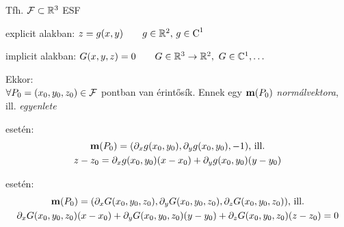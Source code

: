\begin{te}%
  Tfh. $\mathcal F\subset\mathbb{R}^3$ ESF
  \begin{enumzjb}
  \item explicit alakban: $z=g(x,y)\qquad g\in\mathbb{R}^2,\,g\in\operatorname{C}^1$
  \item implicit alakban: $G(x,y,z) = 0\qquad G\in\mathbb{R}^3\to\mathbb{R}^2,\ G\in\mathbb{C}^1,\ldots$
  \end{enumzjb}
  Ekkor:\\
  $\forall P_0=(x_0,y_0,z_0)\in\mathcal F$ pontban van érintősík. Ennek egy $\mathbf{m}(P_0)$ \emph{normálvektora},
  ill. \emph{egyenlete}
  \begin{enumzjr}
  \item esetén:
    \begin{gather*}
      \mathbf{m}(P_0) = (\partial_xg(x_0,y_0), \partial_yg(x_0,y_0),-1)\text{, ill.}\\
      z-z_0 = \partial_xg(x_0,y_0)(x-x_0) + \partial_yg(x_0,y_0)(y-y_0)      
    \end{gather*}

  \item esetén:
    \begin{gather*}
      \mathbf{m}(P_0) = (\partial_xG(x_0,y_0,z_0),\partial_yG(x_0,y_0,z_0),\partial_zG(x_0,y_0,z_0))\text{, ill.}\\
      \partial_xG(x_0,y_0,z_0)(x-x_0) + \partial_yG(x_0,y_0,z_0)(y-y_0) +\partial_zG(x_0,y_0,z_0)(z-z_0) =0
    \end{gather*}    
\end{enumzjr}  
\end{te}
\newpage
